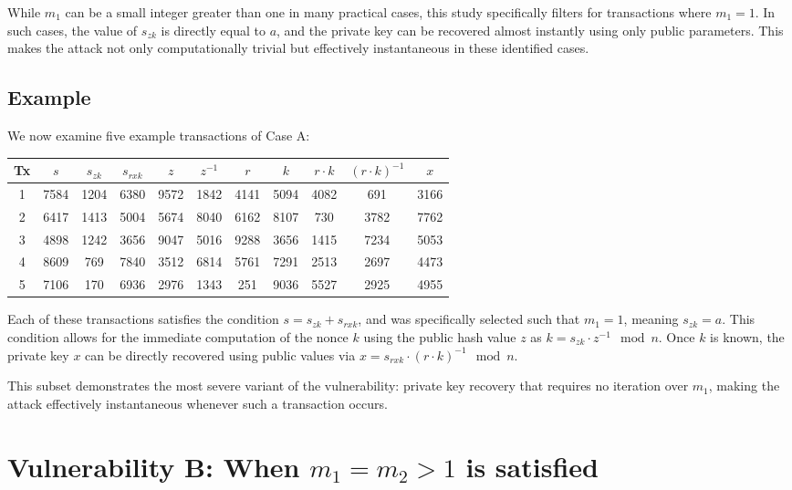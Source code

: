 \documentclass[11pt]{article}
\begin{document}
While \( m_1 \) can be a small integer greater than one in many practical cases, this study specifically filters for transactions where \( m_1 = 1 \). In such cases, the value of \( s_{zk} \) is directly equal to \( a \), and the private key can be recovered almost instantly using only public parameters. This makes the attack not only computationally trivial but effectively instantaneous in these identified cases.

\subsection{Example}
We now examine five example transactions of Case A:

\begin{center}
\begin{tabular}{|c|c|c|c|c|c|c|c|c|c|c|}
\hline
Tx & $s$ & $s_{zk}$ & $s_{rxk}$ & $z$ & $z^{-1}$ & $r$ & $k$ & $r \cdot k$ & $(r \cdot k)^{-1}$ & $x$ \\
\hline
1 & 7584 & 1204 & 6380 & 9572 & 1842 & 4141 & 5094 & 4082 & 691 & 3166 \\
2 & 6417 & 1413 & 5004 & 5674 & 8040 & 6162 & 8107 & 730 & 3782 & 7762 \\
3 & 4898 & 1242 & 3656 & 9047 & 5016 & 9288 & 3656 & 1415 & 7234 & 5053 \\
4 & 8609 & 769 & 7840 & 3512 & 6814 & 5761 & 7291 & 2513 & 2697 & 4473 \\
5 & 7106 & 170 & 6936 & 2976 & 1343 & 251 & 9036 & 5527 & 2925 & 4955 \\
\hline
\end{tabular}
\end{center}

Each of these transactions satisfies the condition \( s = s_{zk} + s_{rxk} \), and was specifically selected such that \( m_1 = 1 \), meaning \( s_{zk} = a \). This condition allows for the immediate computation of the nonce \( k \) using the public hash value \( z \) as \( k = s_{zk} \cdot z^{-1} \mod n \). Once \( k \) is known, the private key \( x \) can be directly recovered using public values via \( x = s_{rxk} \cdot (r \cdot k)^{-1} \mod n \).

This subset demonstrates the most severe variant of the vulnerability: private key recovery that requires no iteration over \( m_1 \), making the attack effectively instantaneous whenever such a transaction occurs.

\section{Vulnerability B: When \texorpdfstring{$m_1 = m_2 > 1$}{m1 = m2 > 1} is satisfied}
\end{document}
